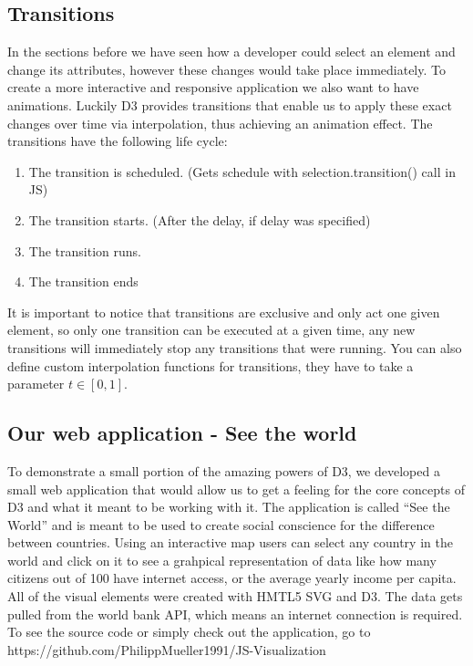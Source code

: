\documentclass{bioinfo}
\begin{document}
\subsection{Transitions} \label{s:transitions}
In the sections before we have seen how a developer could select an element and change its attributes, however these changes would take place immediately. To create a more interactive and responsive application we also want to have animations. Luckily D3 provides transitions that enable us to apply these exact changes over time via interpolation, thus achieving an animation effect. The transitions have the following life cycle:
\begin{enumerate}
\item The transition is scheduled. (Gets schedule with selection.transition() call in JS)
\item The transition starts. (After the delay, if delay was specified)
\item The transition runs.
\item The transition ends
\end{enumerate}
It is important to notice that transitions are exclusive and only act one given element, so only one transition can be executed at a given time, any new transitions will immediately stop any transitions that were running.
You can also define custom interpolation functions for transitions, they have to take a parameter $t \in [0,1]$.

\subsection{Our web application - See the world}
To demonstrate a small portion of the amazing powers of D3, we developed a small web application that would allow us to get a feeling for the core concepts of D3 and what it meant to be working with it. The application is called “See the World” and is meant to be used to create social conscience for the difference between countries. Using an interactive map users can select any country in the world and click on it to see a grahpical representation of data like how many citizens out of 100 have internet access, or the average yearly income per capita.
\newline
All of the visual elements were created with HMTL5 SVG and D3. The data gets pulled from the world bank API, which means an internet connection is required. To see the source code or simply check out the application, go to https://github.com/PhilippMueller1991/JS-Visualization
\end{document}
